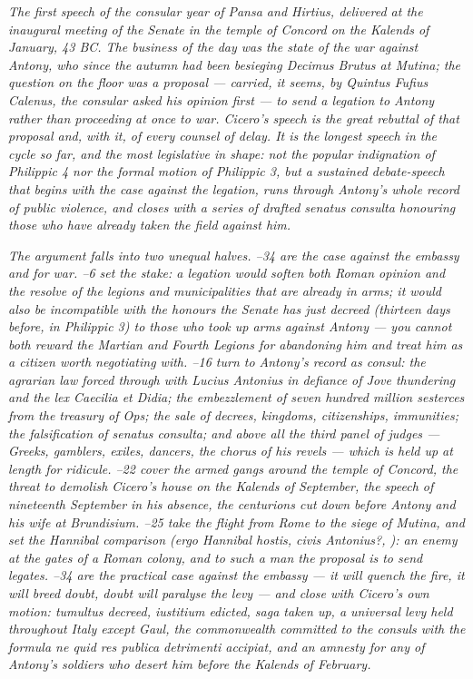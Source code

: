 
\textit{The first speech of the consular year of Pansa and
Hirtius, delivered at the inaugural meeting of the Senate in
the temple of Concord on the Kalends of January, 43 BC. The
business of the day was the state of the war against Antony,
who since the autumn had been besieging Decimus Brutus at
Mutina; the question on the floor was a proposal --- carried,
it seems, by Quintus Fufius Calenus, the consular asked his
opinion first --- to send a legation to Antony rather than
proceeding at once to war. Cicero's speech is the great
rebuttal of that proposal and, with it, of every counsel of
delay. It is the longest speech in the cycle so far, and the
most legislative in shape: not the popular indignation of
Philippic 4 nor the formal motion of Philippic 3, but a
sustained debate-speech that begins with the case against the
legation, runs through Antony's whole record of public
violence, and closes with a series of drafted senatus consulta
honouring those who have already taken the field against him.}

\textit{The argument falls into two unequal halves. --34 are the case against the embassy and for war. --6 set the stake: a legation would soften both Roman opinion
and the resolve of the legions and municipalities that are
already in arms; it would also be incompatible with the honours
the Senate has just decreed (thirteen days before, in Philippic
3) to those who took up arms against Antony --- you cannot
both reward the Martian and Fourth Legions for abandoning him
and treat him as a citizen worth negotiating with. --16 turn to Antony's record as consul: the agrarian law
forced through with Lucius Antonius in defiance of Jove
thundering and the lex Caecilia et Didia; the embezzlement of
seven hundred million sesterces from the treasury of Ops; the
sale of decrees, kingdoms, citizenships, immunities; the
falsification of senatus consulta; and above all the third
panel of judges --- Greeks, gamblers, exiles, dancers, the
chorus of his revels --- which is held up at length for
ridicule. --22 cover the armed gangs around the
temple of Concord, the threat to demolish Cicero's house on
the Kalends of September, the speech of nineteenth September
in his absence, the centurions cut down before Antony and his
wife at Brundisium. --25 take the flight from
Rome to the siege of Mutina, and set the Hannibal comparison
(\textit{ergo Hannibal hostis, civis Antonius?}, ): an enemy at the gates of a Roman colony, and to such a
man the proposal is to send legates. --34 are
the practical case against the embassy --- it will quench the
fire, it will breed doubt, doubt will paralyse the levy ---
and close with Cicero's own motion: \textit{tumultus} decreed,
\textit{iustitium} edicted, \textit{saga} taken up, a
universal levy held throughout Italy except Gaul, the
commonwealth committed to the consuls with the formula \textit{
ne quid res publica detrimenti accipiat}, and an amnesty for
any of Antony's soldiers who desert him before the Kalends
of February.}

